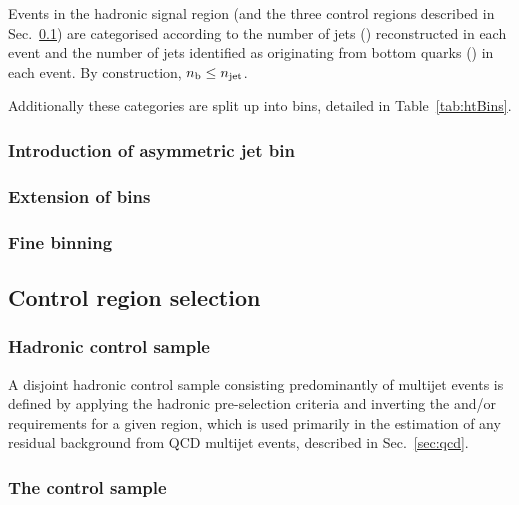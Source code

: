Events in the hadronic signal region (and the
three control regions described in Sec.~\ref{sec:controlSelection}) are
categorised according to the number of jets (\njet) reconstructed in
each event and the number of jets identified as originating from
bottom quarks (\nb) in each event. By construction, $n_{\text{b}} \leq n_{\text{jet}}$.

Additionally these categories are split up into \HT bins, detailed in 
Table~\ref{tab:htBins}.


\subsubsection{Introduction of asymmetric jet bin}


\subsubsection{Extension of \HT bins}

\subsubsection{Fine \njet binning}

\subsection{Control region selection}
\label{sec:controlSelection}

\subsubsection{Hadronic control sample}

A disjoint hadronic control sample consisting predominantly of
multijet events is defined by applying the hadronic pre-selection
criteria and inverting the \alphat and/or \mhtmet requirements for a
given \scalht region, which is used primarily in the estimation of any
residual background from QCD multijet events, described in
Sec.~\ref{sec:qcd}.

\subsubsection{The \texorpdfstring{\mj}{muon plus jets} control sample}

